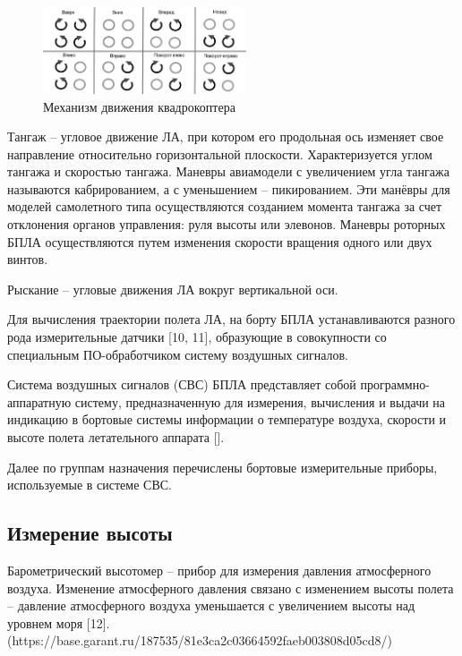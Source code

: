\documentclass[nir, och, master]{SCWorks}
\begin{document}
\begin{figure}[!ht]
	\centering
	\includegraphics[width=6cm]{img/uavRun.png}
	\caption{\label{drone_run}%
	Механизм движения квадрокоптера}
\end{figure}

Тангаж – угловое движение ЛА, при котором его продольная ось изменяет свое 
направление относительно горизонтальной плоскости. Характеризуется углом тангажа 
и скоростью тангажа. Маневры авиамодели с увеличением угла тангажа называются 
кабрированием, а с уменьшением – пикированием. Эти манёвры  для моделей самолетного 
типа осуществляются созданием момента тангажа за счет отклонения органов управления: 
руля высоты или элевонов. Маневры роторных БПЛА осуществляются путем изменения 
скорости вращения одного или двух винтов.

Рыскание – угловые движения ЛА вокруг вертикальной оси.

Для вычисления траектории полета ЛА, на борту БПЛА устанавливаются разного рода 
измерительные датчики [10, 11], образующие в совокупности со специальным 
ПО-обработчиком систему воздушных сигналов.

Система воздушных сигналов (СВС) БПЛА представляет собой программно-аппаратную 
систему, предназначенную для измерения, вычисления и выдачи на индикацию в 
бортовые системы информации о температуре воздуха, скорости и высоте полета 
летательного аппарата [].

Далее по группам назначения перечислены бортовые измерительные приборы, 
используемые в системе СВС.

\subsection*{Измерение высоты}

Барометрический высотомер – прибор для измерения давления атмосферного воздуха. 
Изменение атмосферного давления связано с изменением высоты полета – давление 
атмосферного воздуха уменьшается с увеличением высоты над уровнем моря [12]. (https://base.garant.ru/187535/81e3ca2c03664592faeb003808d05cd8/)
\end{document}
